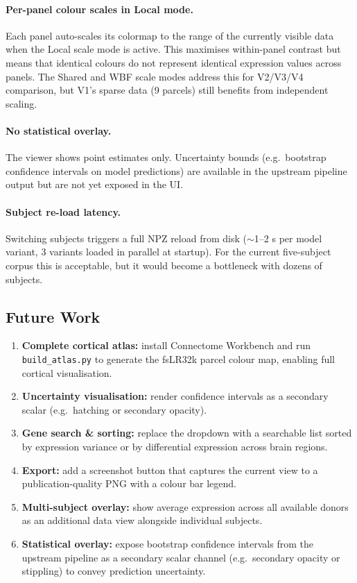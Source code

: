 \documentclass[11pt,letterpaper]{article}
\begin{document}
\paragraph{Per-panel colour scales in Local mode.}
Each panel auto-scales its colormap to the range of the currently
visible data when the Local scale mode is active.
This maximises within-panel contrast but means that identical colours
do not represent identical expression values across panels.
The Shared and WBF scale modes address this for V2/V3/V4 comparison,
but V1's sparse data (9 parcels) still benefits from independent scaling.

\paragraph{No statistical overlay.}
The viewer shows point estimates only.
Uncertainty bounds (e.g.\ bootstrap confidence intervals on model
predictions) are available in the upstream pipeline output but are not
yet exposed in the UI.

\paragraph{Subject re-load latency.}
Switching subjects triggers a full NPZ reload from disk ($\sim$1--2 s
per model variant, 3 variants loaded in parallel at startup).
For the current five-subject corpus this is acceptable, but it would
become a bottleneck with dozens of subjects.

\subsection{Future Work}

\begin{enumerate}[nosep]
  \item \textbf{Complete cortical atlas:} install Connectome Workbench
        and run \texttt{build\_atlas.py} to generate the fsLR32k parcel
        colour map, enabling full cortical visualisation.
  \item \textbf{Uncertainty visualisation:} render confidence intervals
        as a secondary scalar (e.g.\ hatching or secondary opacity).
  \item \textbf{Gene search \& sorting:} replace the dropdown with a
        searchable list sorted by expression variance or by
        differential expression across brain regions.
  \item \textbf{Export:} add a screenshot button that captures the
        current view to a publication-quality PNG with a colour bar legend.
  \item \textbf{Multi-subject overlay:} show average expression across
        all available donors as an additional data view alongside individual subjects.
  \item \textbf{Statistical overlay:} expose bootstrap confidence intervals
        from the upstream pipeline as a secondary scalar channel (e.g.\
        secondary opacity or stippling) to convey prediction uncertainty.
\end{enumerate}
\end{document}
